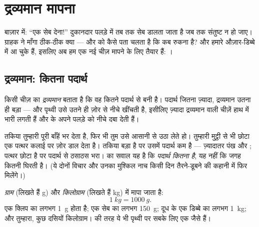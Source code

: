 \chapter{द्रव्यमान मापना}\label{ch:g3:measuring-mass}

बाज़ार में: ``एक  सेब देना!'' दुकानदार पलड़े में तब तक सेब
डालता जाता है जब तक  संतुष्ट न हो जाए। ग्राहक ने माँगा ठीक-ठीक
क्या --- और  को कैसे पता चलता है कि कब रुकना है?  और 
हमारे औज़ार-डिब्बे में आ चुके हैं, इसलिए अब हम एक नई चीज़ मापने के
लिए तैयार हैं: ।

\section{द्रव्यमान: कितना पदार्थ}

\begin{definition}[द्रव्यमान]\label{def:g3:measuring-mass:mass}
किसी चीज़ का \emph{द्रव्यमान} बताता है कि वह कितने
पदार्थ से बनी है। पदार्थ जितना ज़्यादा, द्रव्यमान उतना ही बड़ा ---
और पृथ्वी उसे उतने ही ज़ोर से नीचे खींचती है, इसीलिए ज़्यादा
द्रव्यमान वाली चीज़ें हाथ में भारी लगती हैं और  के अपने पलड़े को
नीचे दबा देती हैं।
\end{definition}

\begin{example}[बड़ा होना भारी होना नहीं है]\label{ex:g3:measuring-mass:bignotcheavy}
तकिया तुम्हारी पूरी बाँहें भर देता है, फिर भी तुम उसे आसानी से उठा
लेते हो। तुम्हारी मुट्ठी से भी छोटा एक पत्थर कलाई पर ज़ोर डाल देता
है। तकिया बड़ा है पर उसमें पदार्थ कम है --- ज़्यादातर पंख और ;
पत्थर छोटा है पर पदार्थ से ठसाठस भरा।  का सवाल यह है कि
\emph{पदार्थ कितना है}, यह नहीं कि जगह कितनी घिरती है। (ये दोनों
विचार और उनका मुश्किल नाच किसी दिन तैरने-डूबने की कहानी में फिर
मिलेंगे।)
\end{example}

\begin{definition}[ग्राम और किलोग्राम]\label{def:g3:measuring-mass:units}
 \emph{ग्राम} (लिखते हैं \unit{g}) और
\emph{किलोग्राम} (लिखते हैं \unit{kg}) में मापा
जाता है:
\[
\qty{1}{kg} = \qty{1000}{g}.
\]
एक क्लिप का  लगभग \qty{1}{g} होता है; एक सेब का लगभग
\qty{150}{g}; दूध के एक डिब्बे का लगभग \qty{1}{kg}; और तुम्हारा,
कुछ दसियों किलोग्राम।  की तरह ये  भी पृथ्वी पर सबके लिए एक
जैसे हैं।
\end{definition}

